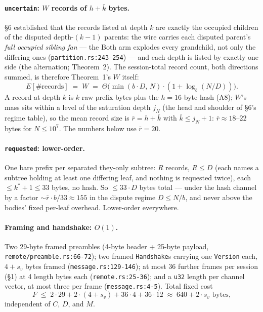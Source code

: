 \documentclass[11pt]{article}
\newcommand{\code}[1]{\texttt{#1}}
\theoremstyle{plain}
\begin{document}
\paragraph{\code{uncertain}: $W$ records of $h + \bar{k}$ bytes.}
\S6 established that the records listed at depth $k$ are exactly the
occupied children of the disputed depth-$(k{-}1)$ parents: the wire
carries each disputed parent's \emph{full occupied sibling fan} --- the
Both arm explodes every grandchild, not only the differing ones
(\code{partition.rs:243-254}) --- and each depth is listed by exactly one
side (the alternation; Theorem~2). The session-total record count, both
directions summed, is therefore Theorem~1's $W$ itself:
\begin{equation*}
E[\#\text{records}] \;=\; W
\;=\; \Theta\bigl(\min(b \cdot D,\, N) \cdot (1 + \log_b(N/D))\bigr).
\end{equation*}
A record at depth $k$ is $k$ raw prefix bytes plus the $h = 16$-byte hash
(A8); $W$'s mass sits within a level of the saturation depth $j_N$ (the
head and shoulder of \S6's regime table), so the mean record size is
$\bar{r} = h + \bar{k}$ with $\bar{k} \le j_N + 1$: $\bar{r} \approx
18$--$22$ bytes for $N \le 10^7$. The numbers below use $\bar{r} = 20$.

\paragraph{\code{requested}: lower-order.} One bare prefix per separated
they-only subtree: $R$ records, $R \le D$ (each names a subtree holding at
least one differing leaf, and nothing is requested twice), each
$\le k^* + 1 \le 33$ bytes, no hash. So $\le 33 \cdot D$ bytes total ---
under the hash channel by a factor ${\sim}\bar{r} \cdot b/33 \approx 155$
in the dispute regime $D \le N/b$, and never above the bodies' fixed
per-leaf overhead. Lower-order everywhere.

\paragraph{Framing and handshake: $O(1)$.} Two 29-byte framed preambles
(4-byte header + 25-byte payload, \code{remote/preamble.rs:66-72}); two
framed \code{Handshake}s carrying one
\code{Version} each, $4 + s_v$ bytes framed (\code{message.rs:129-146});
at most 36 further frames per session (\S1) at 4 length bytes each
(\code{remote.rs:25-36}); and a \code{u32} length per channel vector, at
most three per frame (\code{message.rs:4-5}). Total fixed cost
\begin{equation*}
F \;\le\; 2 \cdot 29 + 2 \cdot (4 + s_v) + 36 \cdot 4 + 36 \cdot 12
\;\approx\; 640 + 2 \cdot s_v \text{ bytes},
\end{equation*}
independent of $C$, $D$, and $M$.
\end{document}
